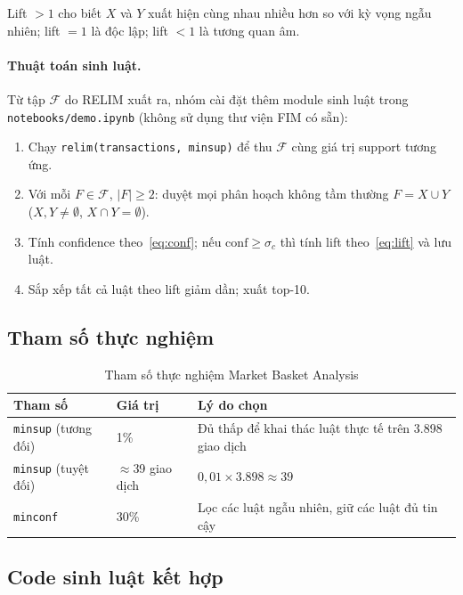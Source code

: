 \documentclass[12pt,a4paper]{report}
\begin{document}
Lift $> 1$ cho biết $X$ và $Y$ xuất hiện cùng nhau nhiều hơn so với kỳ vọng ngẫu
nhiên; lift $= 1$ là độc lập; lift $< 1$ là tương quan âm.

\paragraph{Thuật toán sinh luật.}
Từ tập $\mathcal{F}$ do RELIM xuất ra, nhóm cài đặt thêm module sinh luật trong
\texttt{notebooks/demo.ipynb} (không sử dụng thư viện FIM có sẵn):

\begin{enumerate}[label=\arabic*.]
    \item Chạy \texttt{relim(transactions, minsup)} để thu $\mathcal{F}$ cùng
          giá trị support tương ứng.
    \item Với mỗi $F \in \mathcal{F}$, $|F| \geq 2$: duyệt mọi phân hoạch
          không tầm thường $F = X \cup Y$ ($X, Y \neq \emptyset$, $X \cap Y = \emptyset$).
    \item Tính confidence theo~\eqref{eq:conf}; nếu $\mathrm{conf} \geq \sigma_c$
          thì tính lift theo~\eqref{eq:lift} và lưu luật.
    \item Sắp xếp tất cả luật theo lift giảm dần; xuất top-10.
\end{enumerate}

\subsection{Tham số thực nghiệm}

\begin{table}[H]
    \centering
    \caption{Tham số thực nghiệm Market Basket Analysis}
    \label{tab:mba-params}
    \begin{tabular}{lll}
    \toprule
    \textbf{Tham số} & \textbf{Giá trị} & \textbf{Lý do chọn} \\
    \midrule
    \texttt{minsup} (tương đối) & 1\% & Đủ thấp để khai thác luật thực tế trên 3.898 giao dịch \\
    \texttt{minsup} (tuyệt đối) & $\approx$39 giao dịch & $0{,}01 \times 3.898 \approx 39$ \\
    \texttt{minconf} & 30\% & Lọc các luật ngẫu nhiên, giữ các luật đủ tin cậy \\
    \bottomrule
    \end{tabular}
\end{table}

\subsection{Code sinh luật kết hợp}
\end{document}
